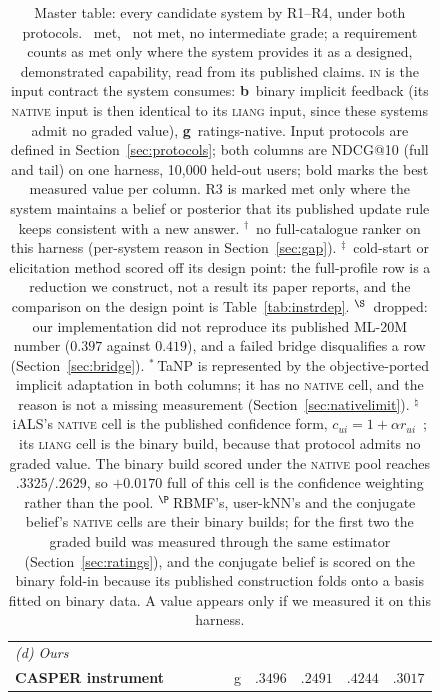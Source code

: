 \documentclass[manuscript,screen,review]{acmart}
\newcommand{\cmark}{\ding{51}}
\newcommand{\xmark}{\ding{55}}
\begin{document}
\begin{table}[t]
\begin{tabular}{p{4.9cm}cccc c r@{\,/\,}l r@{\,/\,}l}
\midrule
\multicolumn{10}{l}{\emph{(d) Ours}}\\
\textbf{CASPER instrument} & \cmark & \cmark & \cmark & \cmark & g & $.3496$ & $.2491$ & $.4244$ & $.3017$ \\
\bottomrule
\end{tabular}
\caption{Master table: every candidate system by R1--R4, under both protocols. \cmark~met, \xmark~not met, no intermediate grade; a requirement counts as met only where the system provides it as a designed, demonstrated capability, read from its published claims. \textsc{in} is the input contract the system consumes: \textbf{b}~binary implicit feedback (its \textsc{native} input is then identical to its \textsc{liang} input, since these systems admit no graded value), \textbf{g}~ratings-native. Input protocols are defined in Section~\ref{sec:protocols}; both columns are NDCG@10 (full and tail) on one harness, 10,000 held-out users; bold marks the best measured value per column. R3 is marked met only where the system maintains a belief or posterior that its published update rule keeps consistent with a new answer. $^{\dagger}$~no full-catalogue ranker on this harness (per-system reason in Section~\ref{sec:gap}). $^{\ddagger}$~cold-start or elicitation method scored off its design point: the full-profile row is a reduction we construct, not a result its paper reports, and the comparison on the design point is Table~\ref{tab:instrdep}. $^{\S}$~dropped: our implementation did not reproduce its published ML-20M number ($0.397$ against $0.419$), and a failed bridge disqualifies a row (Section~\ref{sec:bridge}). $^{\ast}$\,TaNP is represented by the objective-ported implicit adaptation in both columns; it has no \textsc{native} cell, and the reason is not a missing measurement (Section~\ref{sec:nativelimit}). $^{\natural}$\,iALS's \textsc{native} cell is the published confidence form, $c_{ui}=1+\alpha r_{ui}$~\citep{hu2008collaborative}; its \textsc{liang} cell is the binary build, because that protocol admits no graded value. The binary build scored under the \textsc{native} pool reaches $.3325/.2629$, so $+0.0170$ full of this cell is the confidence weighting rather than the pool. $^{\P}$\,RBMF's, user-kNN's and the conjugate belief's \textsc{native} cells are their binary builds; for the first two the graded build was measured through the same estimator (Section~\ref{sec:ratings}), and the conjugate belief is scored on the binary fold-in because its published construction folds onto a basis fitted on binary data. A value appears only if we measured it on this harness.}
\label{tab:master}
\end{table}
\end{document}

